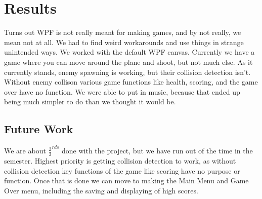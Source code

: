 \documentclass[10pt,conference,onecolumn,compsoc]{IEEEtran}
\begin{document}
\section{Results}
Turns out WPF is not really meant for making games, and by not really, we mean not at all. We had to find weird workarounds and use things in strange unintended ways. We worked with the default WPF canvas. Currently we have a game where you can move around the plane and shoot, but not much else. As it currently stands, enemy spawning is working, but their collision detection isn't. Without enemy collison various game functions like health, scoring, and the game over have no function. We were able to put in music, because that ended up being much simpler to do than we thought it would be.

\subsection{Future Work}
We are about $\frac{2}{3}^{rds}$ done with the project, but we have run out of the time in the semester. Highest priority is getting collision detection to work, as without collision detection key functions of the game like scoring have no purpose or function. Once that is done we can move to making the Main Menu and Game Over menu, including the saving and displaying of high scores.





\end{document}
